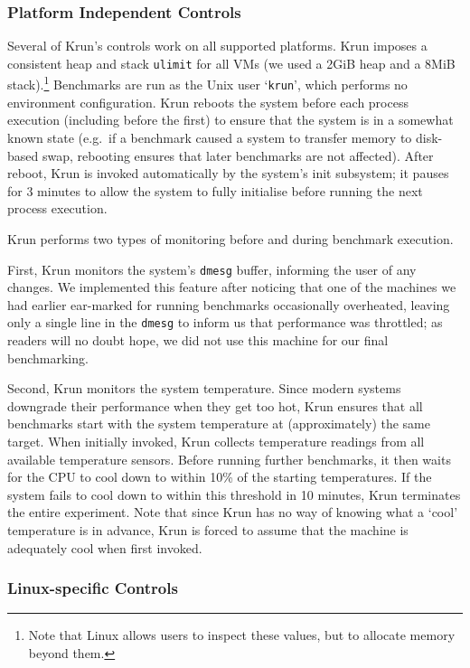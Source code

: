 \documentclass[a4paper,UKenglish]{lipics}
\newcommand{\krun}{Krun\xspace}
\begin{document}
\subsubsection{Platform Independent Controls}

Several of \krun's controls work on all supported platforms. \krun imposes a
consistent heap and stack \texttt{ulimit} for all
VMs (we used a 2GiB heap and a 8MiB stack).\footnote{Note that Linux allows users
to inspect these values, but to allocate memory beyond them.} Benchmarks are run
as the Unix user `\texttt{krun}', which performs no environment configuration.
\krun reboots the system before each process execution (including
before the first) to ensure that the system is in a somewhat known state
(e.g.~if a benchmark caused a system to transfer memory to disk-based swap,
rebooting ensures that later benchmarks are not affected). After reboot, \krun
is invoked automatically by the system's init subsystem; it pauses for 3 minutes to allow the system
to fully initialise before running the next process execution.

\krun performs two types of monitoring before and during benchmark execution.

First, \krun monitors the system's \texttt{dmesg} buffer, informing the user of
any changes. We implemented this feature after noticing that one of the
machines we had earlier ear-marked for running benchmarks occasionally
overheated, leaving only a single line in the \texttt{dmesg} to inform us that
performance was throttled; as
readers will no doubt hope, we did not use this machine for our final
benchmarking.

Second, \krun monitors the system temperature. Since modern systems downgrade
their performance when they get too hot, \krun ensures that all benchmarks
start with the system temperature at (approximately) the same target. When
initially invoked, \krun collects temperature readings from all available
temperature sensors. Before running
further benchmarks, it then waits for the CPU to cool down to within 10\%{} of
the starting temperatures. If the system fails to cool down to within
this threshold in 10 minutes, \krun terminates the entire experiment. Note that
since \krun has no way of knowing what a `cool' temperature is in advance,
\krun is forced to assume that the machine is adequately cool when first invoked.


\subsubsection{Linux-specific Controls}
\end{document}
